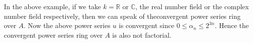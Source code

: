 \begin{rem} %
In the above example, if we take $k = \mathbb{R}$ or $\mathbb{C}$, the
real number field or the complex number field respectively, then we
can speak of the\pageoriginale convergent power series ring over
$A$. Now the above power series $u$ is convergent since $0 \le
\alpha_n \le 2^{3n}$. Hence the convergent power series ring over $A$
is also not factorial. 
\end{rem}  
      
